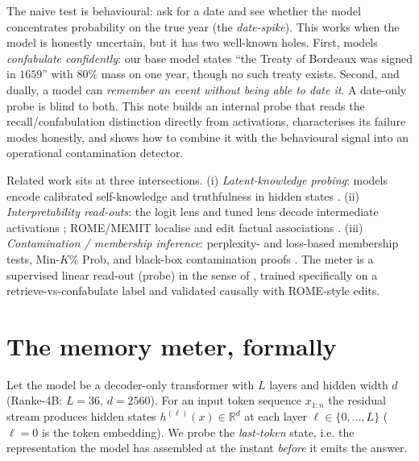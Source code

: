 \documentclass[11pt]{article}
\begin{document}
The naive test is behavioural: ask for a date and see whether the model concentrates probability on the true year
(the \emph{date-spike}). This works when the model is honestly uncertain, but it has two well-known holes. First, models
\emph{confabulate confidently}: our base model states ``the Treaty of Bordeaux was signed in $1659$'' with $80\%$ mass on
one year, though no such treaty exists. Second, and dually, a model can \emph{remember an event without being able to
date it}. A date-only probe is blind to both. This note builds an internal probe that reads the recall/confabulation
distinction directly from activations, characterises its failure modes honestly, and shows how to combine it with the
behavioural signal into an operational contamination detector.

Related work sits at three intersections. (i) \emph{Latent-knowledge probing}: models encode calibrated self-knowledge
and truthfulness in hidden states \cite{kadavath,azaria,burns,zou,alain}. (ii) \emph{Interpretability read-outs}: the
logit lens and tuned lens decode intermediate activations \cite{logitlens,tunedlens}; ROME/MEMIT localise and edit
factual associations \cite{rome,memit}. (iii) \emph{Contamination / membership inference}: perplexity- and
loss-based membership tests, Min-$K\%$ Prob, and black-box contamination proofs \cite{minkprob,carlini21,carlini23,oren,golchin}.
The meter is a supervised linear read-out (probe) in the sense of \cite{alain}, trained specifically on a
retrieve-vs-confabulate label and validated causally with ROME-style edits.

\section{The memory meter, formally}\label{sec:meter}
Let the model be a decoder-only transformer with $L$ layers and hidden width $d$ (Ranke-4B: $L=36$, $d=2560$). For an
input token sequence $x_{1:n}$ the residual stream produces hidden states $h^{(\ell)}(x)\in\mathbb{R}^{d}$ at each layer
$\ell\in\{0,\dots,L\}$ ($\ell{=}0$ is the token embedding). We probe the \emph{last-token} state, i.e. the
representation the model has assembled at the instant \emph{before} it emits the answer.
\end{document}
